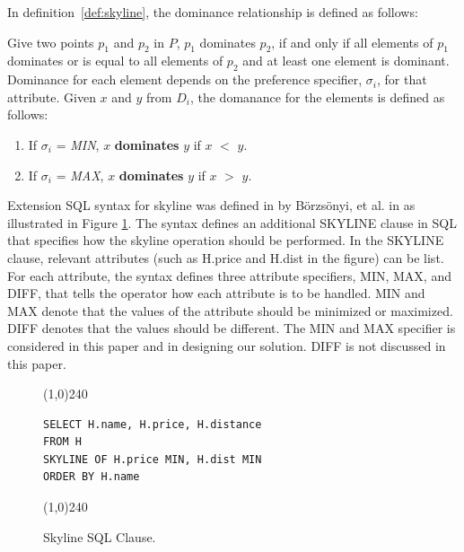 \documentclass{sig-alternate}
\newenvironment{definition}[1][Definition]{\begin{trivlist}
\item[\hskip \labelsep {\bfseries #1}]}{\end{trivlist}}
\begin{document}
In definition~\ref{def:skyline}, the dominance relationship is defined
as follows:

\begin{definition}[Dominance Relationship]
Give two points $p_1$ and $p_2$ in $P$, $p_1$ dominates $p_2$, if and
only if all elements of $p_1$ dominates or is equal to all elements of
$p_2$ and at least one element is dominant. Dominance
for each element depends on the preference specifier,
$\sigma_i$, for that attribute. Given $x$ and $y$ from $D_i$, the
domanance for the elements is defined as follows:

\begin{enumerate}
\item If $\sigma_i$ = \emph{MIN}, $x$ {\bf dominates} $y$ if $x$ $<$ $y$.
\item If $\sigma_i$ = \emph{MAX}, $x$ {\bf dominates} $y$ if $x$ $>$ $y$.
\end{enumerate}

\end{definition}

Extension SQL syntax for skyline was defined in by  B\"{o}rzs\"{o}nyi, et al. in
\cite{skyline_operator} as illustrated in Figure \ref{fig:skyline_sql}. The syntax defines an additional
SKYLINE clause in SQL that specifies how the skyline operation should be performed. In the
SKYLINE clause, relevant attributes (such as H.price and H.dist in the figure) can be list. For each
attribute, the syntax defines three attribute
specifiers, MIN, MAX, and DIFF, that tells the operator how each attribute is to be handled.
MIN and MAX denote that the values of the attribute should be minimized or maximized. DIFF
denotes that the values should be different. The MIN and MAX specifier is considered in this paper
and in designing our solution. DIFF is not discussed in this paper.

\begin{figure}[h]
\begin{center}
\line(1,0){240}
\begin{verbatim}
SELECT H.name, H.price, H.distance
FROM H
SKYLINE OF H.price MIN, H.dist MIN
ORDER BY H.name
\end{verbatim}
\line(1,0){240}
\caption{\small Skyline SQL Clause.
\label{fig:skyline_sql}}
\end{center}
\end{figure}

\end{document}

